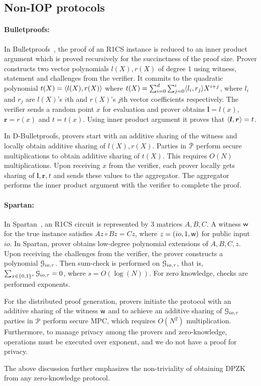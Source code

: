 \subsection{Non-IOP protocols}
\paragraph*{Bulletproofs:}
In Bulletproofs~\cite{bulletproofs}, the proof of an R1CS instance is reduced to an inner product argument which is proved recursively for the succinctness of the proof size. 
Prover constructs two vector polynomials $l(X), r(X)$ of degree $1$ using witness, statement and challenges from the verifier. It commits to the quadratic polynomial $t(X) = \langle l(X),r(X)\rangle$ where $t(X) = \sum_{i=0}^{d} \sum_{j=0}^{i} \langle l_i,r_j\rangle X^{i+j}$, where $l_i$ and $r_j$ are $l(X)$'s $i$th and $r(X)$'s $j$th vector coefficients respectively.
The verifier sends a random point $x$ for evaluation and prover obtains ${\bm l} = l(x)$, ${\bm r} = r(x)$ and $t = t(x)$. Using inner product argument it proves that $\langle {\bm l},{\bm r}\rangle = t$.

In D-Bulletproofs, provers start with an additive sharing of the witness and locally obtain additive sharing of $l(X), r(X)$. Parties in $\mathcal{P}$ perform secure multiplications to obtain additive sharing of $t(X)$. This requires $O(N)$ multiplications. Upon receiving $x$ from the verifier, each prover locally gets sharing of ${\bm l,\bm r}, t$ and sends these values to the aggregator. The aggregator performs the inner product argument with the verifier to complete the proof.

\paragraph*{Spartan:}
In Spartan~\cite{spartan}, an R1CS circuit is represented by 3 matrices $A, B, C$. A witness $\mathsf{w}$ for the true instance satisfies $Az  \circ Bz = Cz$, where $z = (io, 1, \mathsf{w})$ for public input $io$. In Spartan, prover obtains low-degree polynomial extensions of $A, B, C, z$. Upon receiving the challenges from the verifier, the prover constructs a polynomial $\mathcal{G}_{io,\tau}$. Then sum-check is performed on $\mathcal{G}_{io,\tau}$, that is, $\sum_{x\in\{0,1\}^s} \mathcal{G}_{io,\tau} = 0$, where $s = O(\log (N))$. For zero knowledge, checks are performed exponents.

For the distributed proof generation, provers initiate the protocol with an additive sharing of the witness $\mathsf{w}$ and to achieve an additive sharing of $\mathcal{G}_{io,\tau}$ parties in $\mathcal{P}$ perform secure MPC, which requires $O(N^2)$ multiplication. Furthermore, to manage privacy among the provers and zero-knowledge, operations must be executed over exponent, and we do not have a proof for privacy. 

The above discussion further emphasizes the non-triviality of obtaining DPZK from any zero-knowledge protocol. 